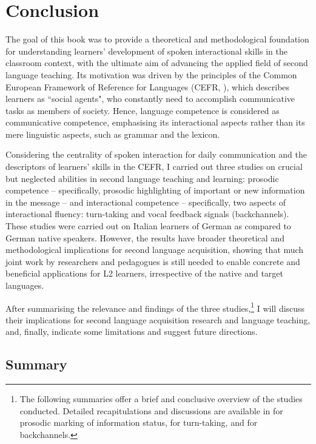 \chapter{Conclusion}
\label{chap:5}
The goal of this book was to provide a theoretical and methodological foundation for understanding learners’ development of spoken interactional skills in the classroom context, with the ultimate aim of advancing the applied field of second language teaching. Its motivation was driven by the principles of the Common European Framework of Reference for Languages (CEFR, \citealt{CouncilOfEurope2001}), which describes learners as ``social agents", who constantly need to accomplish communicative tasks as members of society. Hence, language competence is considered as communicative competence, emphasising its interactional aspects rather than its mere linguistic aspects, such as grammar and the lexicon.

Considering the centrality of spoken interaction for daily communication and the descriptors of learners’ skills in the CEFR, I carried out three studies on crucial but neglected abilities in second language teaching and learning: prosodic competence – specifically, prosodic highlighting of important or new information in the message – and interactional competence – specifically, two aspects of interactional fluency: turn-taking and vocal feedback signals (backchannels). These studies were carried out on Italian learners of German as compared to German native speakers. However, the results have broader theoretical and methodological implications for second language acquisition, showing that much joint work by researchers and pedagogues is still needed to enable concrete and beneficial applications for L2 learners, irrespective of the native and target languages.

After summarising the relevance and findings of the three studies,\footnote{The following summaries offer a brief and conclusive overview of the studies conducted. Detailed recapitulations and discussions are available in  for prosodic marking of information status,  for turn-taking, and  for backchannels.} I will discuss their implications for second language acquisition research and language teaching, and, finally, indicate some limitations and suggest future directions.

\section{Summary}
